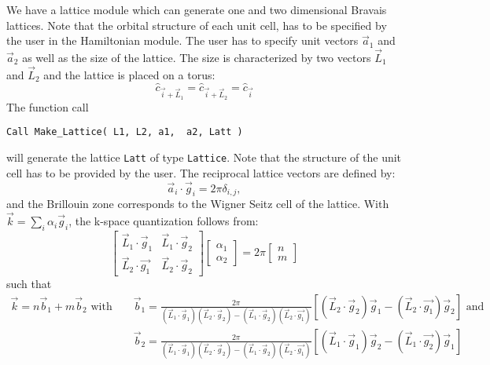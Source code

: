 We have a lattice module  which can generate one and two dimensional Bravais lattices.
Note that the orbital structure of each unit cell, has to be specified by the user in the Hamiltonian module. 
 The user has to specify unit vectors $\vec{a}_1$ and $\vec{a}_2$ as well as the size of the  lattice. The size is  characterized by  two vectors $\vec{L}_1$ and $\vec{L}_2$   and  the lattice is placed on a torus: 
\begin{equation}
	\hat{c}_{\vec{i} + \vec{L}_1 }  = \hat{c}_{\vec{i} + \vec{L}_2 }  = \hat{c}_{\vec{i}}
\end{equation}
The function call 
\begin{lstlisting} 
Call Make_Lattice( L1, L2, a1,  a2, Latt )
\end{lstlisting}
will generate the lattice   \texttt{Latt} of type \texttt{Lattice}.   Note that  the structure of the unit cell has to be provided by the user.    The reciprocal lattice vectors are defined by: 
\begin{equation}
\label{Latt.G.eq}
	\vec{a}_i  \cdot \vec{g}_i = 2 \pi \delta_{i,j}, 
\end{equation}
and the Brillouin zone corresponds to the Wigner Seitz cell of the lattice. 
With $\vec{k} = \sum_{i} \alpha_i  \vec{g}_i $, the  k-space quantization follows from: 
\begin{equation}
\begin{bmatrix}
	\vec{L}_1 \cdot \vec{g}_1  &  \vec{L}_1 \cdot \vec{g}_2  \\
	\vec{L}_2  \cdot \vec{g_1} & \vec{L}_2 \cdot  \vec{g}_2  
\end{bmatrix}
\begin{bmatrix}
   \alpha_1 \\
   \alpha_2
\end{bmatrix}
=
2 \pi 
\begin{bmatrix}
   n \\
   m
\end{bmatrix}
\end{equation}
such that 
\begin{eqnarray}
\label{k.quant.eq}
     \vec{k} =  n \vec{b}_1  + m \vec{b}_2 \text{  with  }   & &   \vec{b}_1 = \frac{2 \pi}{ (\vec{L}_1 \cdot \vec{g}_1)  (\vec{L}_2 \cdot  \vec{g}_2 )  - (\vec{L}_1 \cdot \vec{g}_2) (\vec{L}_2  \cdot \vec{g_1} ) }   \left[  (\vec{L}_2 \cdot  \vec{g}_2) \vec{g}_1 -   (\vec{L}_2  \cdot \vec{g_1} ) \vec{g}_2 \right] \text{   and  } \nonumber \\ 
        & & \vec{b}_2 = \frac{2 \pi}{ (\vec{L}_1 \cdot \vec{g}_1)  (\vec{L}_2 \cdot  \vec{g}_2 )  - (\vec{L}_1 \cdot \vec{g}_2) (\vec{L}_2  \cdot \vec{g_1} ) }   
           \left[  (\vec{L}_1 \cdot  \vec{g}_1) \vec{g}_2 -   (\vec{L}_1  \cdot \vec{g_2} ) \vec{g}_1 \right] 
\end{eqnarray}
